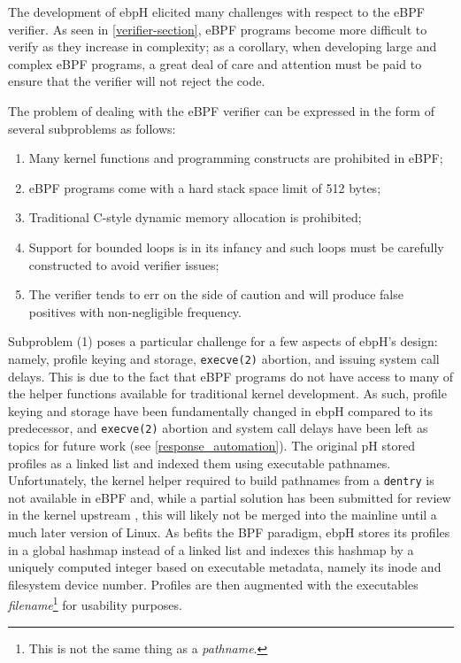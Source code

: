 \documentclass[
  12pt]{findlay}
\newcommand{\passthrough}[1]{#1}
\providecommand{\tightlist}{\setlength{\itemsep}{0pt}\setlength{\parskip}{0pt}}
\begin{document}
The development of ebpH elicited many challenges with respect to the
eBPF verifier. As seen in \autoref{verifier-section}, eBPF programs
become more difficult to verify as they increase in complexity; as a
corollary, when developing large and complex eBPF programs, a great deal
of care and attention must be paid to ensure that the verifier will not
reject the code.

The problem of dealing with the eBPF verifier can be expressed in the
form of several subproblems as follows:

\begin{enumerate}
\def\labelenumi{\arabic{enumi})}
\tightlist
\item
  Many kernel functions and programming constructs are prohibited in
  eBPF;
\item
  eBPF programs come with a hard stack space limit of 512 bytes;
\item
  Traditional C-style dynamic memory allocation is prohibited;
\item
  Support for bounded loops is in its infancy and such loops must be
  carefully constructed to avoid verifier issues;
\item
  The verifier tends to err on the side of caution and will produce
  false positives with non-negligible frequency.
\end{enumerate}

Subproblem (1) poses a particular challenge for a few aspects of ebpH's
design: namely, profile keying and storage,
\passthrough{\lstinline!execve(2)!} abortion, and issuing system call
delays. This is due to the fact that eBPF programs do not have access to
many of the helper functions available for traditional kernel
development. As such, profile keying and storage have been fundamentally
changed in ebpH compared to its predecessor, and
\passthrough{\lstinline!execve(2)!} abortion and system call delays have
been left as topics for future work (see \autoref{response_automation}).
The original pH \autocite{soma02} stored profiles as a linked list and
indexed them using executable pathnames. Unfortunately, the kernel
helper required to build pathnames from a
\passthrough{\lstinline!dentry!} is not available in eBPF and, while a
partial solution has been submitted for review in the kernel upstream
\autocite{zhang19}, this will likely not be merged into the mainline
until a much later version of Linux. As befits the BPF paradigm, ebpH
stores its profiles in a global hashmap instead of a linked list and
indexes this hashmap by a uniquely computed integer based on executable
metadata, namely its inode and filesystem device number. Profiles are
then augmented with the executables \emph{filename}\footnote{This is
not the same thing as a \emph{pathname}.} for usability purposes.
\end{document}

